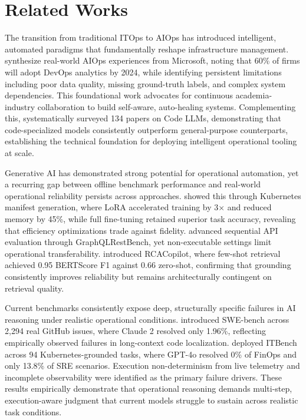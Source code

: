 \documentclass[conference]{IEEEtran}
\begin{document}
\section{Related Works}\label{sec2}


The transition from traditional ITOps to AIOps has introduced intelligent, automated paradigms that fundamentally reshape infrastructure management. \cite{dang2019aiops} synthesize real-world AIOps experiences from Microsoft, noting that 60\% of firms will adopt DevOps analytics by 2024, while identifying persistent limitations including poor data quality, missing ground-truth labels, and complex system dependencies. This foundational work advocates for continuous academia-industry collaboration to build self-aware, auto-healing systems. Complementing this, \cite{zheng2023survey} systematically surveyed 134 papers on Code LLMs, demonstrating that code-specialized models consistently outperform general-purpose counterparts, establishing the technical foundation for deploying intelligent operational tooling at scale.

Generative AI has demonstrated strong potential for operational automation, yet a recurring gap between offline benchmark performance and real-world operational reliability persists across approaches. \cite{sacco2025intent} showed this through Kubernetes manifest generation, where LoRA accelerated training by 3× and reduced memory by 45\%, while full fine-tuning retained superior task accuracy, revealing that efficiency optimizations trade against fidelity. \cite{saha2024sequential} advanced sequential API evaluation through GraphQLRestBench, yet non-executable settings limit operational transferability. \cite{shan2025rca} introduced RCACopilot, where few-shot retrieval achieved 0.95 BERTScore F1 against 0.66 zero-shot, confirming that grounding consistently improves reliability but remains architecturally contingent on retrieval quality.

Current benchmarks consistently expose deep, structurally specific failures in AI reasoning under realistic operational conditions. \cite{jimenez2023swe} introduced SWE-bench across 2,294 real GitHub issues, where Claude 2 resolved only 1.96\%, reflecting empirically observed failures in long-context code localization. \cite{jha2025itbench} deployed ITBench across 94 Kubernetes-grounded tasks, where GPT-4o resolved 0\% of FinOps and only 13.8\% of SRE scenarios. Execution non-determinism from live telemetry and incomplete observability were identified as the primary failure drivers. These results empirically demonstrate that operational reasoning demands multi-step, execution-aware judgment that current models struggle to sustain across realistic task conditions.
\end{document}
